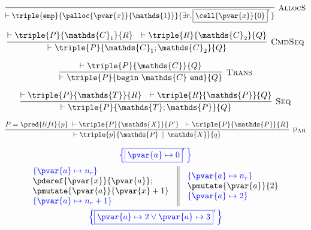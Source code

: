 \[
\infer[\textsc{AllocS}]
{
	\vdash \triple
	{\mathtt{emp}}
	{\palloc{\pvar{x}}{\mathds{1}}}
	{\exists r \ldotp \boxed{\cell{\pvar{x}}{0}}^r}
}
{}
\]

\[
\infer[\textsc{CmdSeq}]
{
	\vdash \triple
	{P}
	{\mathds{C}_1; \mathds{C}_2}
	{Q}
}
{
	\vdash \triple
	{P}
	{\mathds{C}_1}
	{R}\ \
	\vdash \triple
	{R}
	{\mathds{C}_2}
	{Q}
}
\]

\[
\infer[\textsc{Trans}]
{
	\vdash \triple
	{P}
	{\mathtt{begin}\ \mathds{C}\ \mathtt{end}}
	{Q}
}
{
	\vdash \triple
	{P}
	{\mathds{C}}
	{Q}
}
\]

\[
\infer[\textsc{Seq}]
{
	\vdash \triple
	{P}
	{\mathds{T}; \mathds{P}}
	{Q}
}
{
	\vdash \triple
	{P}
	{\mathds{T}}
	{R}\ \
	\vdash \triple
	{R}
	{\mathds{P}}
	{Q}
}
\]

\[
\infer[\textsc{Par}]
{
	\vdash \triple
	{p}
	{\mathds{P}\ ||\ \mathds{X}}
	{q}
}
{
	P = \pred{lift}{p}\
	\vdash \triple
	{P}
	{\mathds{X}}
	{P'}\ \
	\vdash \triple
	{P}
	{\mathds{P}}
	{R}
}
\]

\iffalse
\begin{gather*}
\color{blue} \left\lbrace \boxed{\pvar{a} \mapsto 0}^r \right\rbrace \\
\begin{array}{c || c}
\begin{array}{l}
\color{blue} \left\lbrace \pvar{a} \mapsto n_r \right\rbrace \\
\pderef{\pvar{x}}{\pvar{a}}; \\
\pmutate{\pvar{a}}{\pvar{x} + 1} \\
\color{blue} \left\lbrace \pvar{a} \mapsto n_r + 1 \right\rbrace
\end{array}
&
\begin{array}{l}
\color{blue} \left\lbrace \pvar{a} \mapsto n_r \right\rbrace \\
\pmutate{\pvar{a}}{2} \\
\color{blue} \left\lbrace \pvar{a} \mapsto 2 \right\rbrace
\end{array}
\end{array} \\
\color{blue} \left\lbrace \boxed{\pvar{a} \mapsto 2 \lor \pvar{a} \mapsto 3}^r \right\rbrace
\end{gather*}

